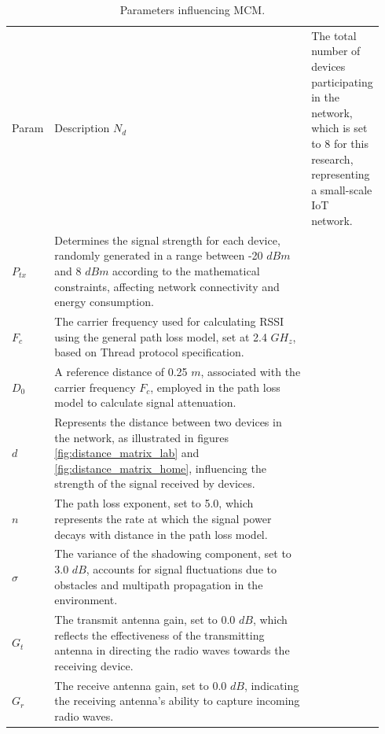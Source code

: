 \begin{longtable}{>{\hspace{0pt}}m{0.098\linewidth}>{\hspace{0pt}}m{0.842\linewidth}}
    \label{tab:monte_carlo_parameters}\\
    \caption{Parameters influencing \acrlong{MCM}.}\\
    \hline\hline
    Param & Description
    \endfirsthead
    \hline
    $N_d$     & The total number of devices participating in the network, which is set to 8 for this research, representing a small-scale \gls{IoT} network.                                                                              \\
    $P_{tx}$  & Determines the signal strength for each device, randomly generated in a range between -20 $dBm$ and 8 $dBm$ according to the mathematical constraints, affecting network connectivity and energy consumption.       \\
    $F_c$     & The carrier frequency used for calculating \gls{RSSI} using the general path loss model, set at 2.4 ${GH}_z$, based on Thread protocol specification.                                                                     \\
    $D_0$     & A reference distance of 0.25 $m$, associated with the carrier frequency $F_c$, employed in the path loss model to calculate signal attenuation.                                                                     \\
    $d$       & Represents the distance between two devices in the network, as illustrated in figures \ref{fig:distance_matrix_lab} and \ref{fig:distance_matrix_home}, influencing the strength of the signal received by devices. \\
    $n$       & The path loss exponent, set to 5.0, which represents the rate at which the signal power decays with distance in the path loss model.                                                                                \\
    $\sigma$  & The variance of the shadowing component, set to 3.0 $dB$, accounts for signal fluctuations due to obstacles and multipath propagation in the environment.                                                           \\
    $G_t$     & The transmit antenna gain, set to 0.0 $dB$, which reflects the effectiveness of the transmitting antenna in directing the radio waves towards the receiving device.                                                 \\
    $G_r$     & The receive antenna gain, set to 0.0 $dB$, indicating the receiving antenna's ability to capture incoming radio waves.                                                                                              \\
    \hline\hline
\end{longtable}


